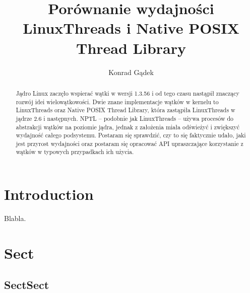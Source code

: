 \documentclass[prodmode]{acmsmall}
\begin{document}

\title{Porównanie wydajności LinuxThreads i Native POSIX Thread Library}
\author{Konrad Gądek
}

\begin{abstract}
Jądro Linux zaczęło wspierać wątki w wersji 1.3.56\cite{mimuw:linux} i od tego czasu nastąpił znaczący rozwój idei wielowątkowości. Dwie znane implementacje wątków w kernelu to LinuxThreads oraz Native POSIX Thread Library, która zastąpiła LinuxThreads w jądrze 2.6 i następnych\cite{wiki:ntpl-pl}. NPTL -- podobnie jak LinuxThreads -- używa procesów do abstrakcji wątków na poziomie jądra\cite{wiki:ntpl}, jednak z założenia miała odświeżyć i zwiększyć wydajność całego podsystemu\cite{redhat:nptl}. Postaram się sprawdzić, czy to się faktycznie udało, jaki jest przyrost wydajności oraz postaram się opracować API upraszczające korzystanie z wątków w typowych przypadkach ich użycia.
\end{abstract}

%

\maketitle


\section{Introduction}
Blabla.


\section{Sect}

\subsection{SectSect}
\end{document}
